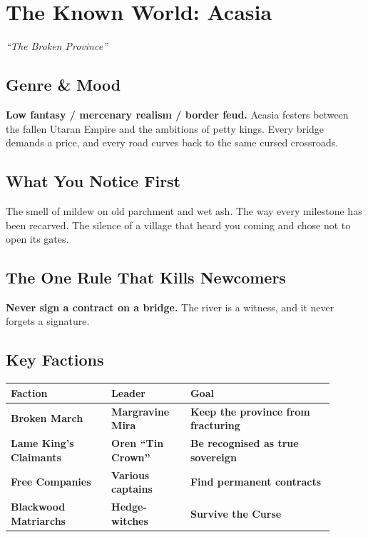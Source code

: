 \documentclass[10pt,twocolumn]{article} %
\begin{document}
\section{The Known World: Acasia}
\textit{``The Broken Province''}

\subsection{Genre \& Mood}
\textbf{Low fantasy / mercenary realism / border feud.} Acasia festers between the fallen Utaran Empire and the ambitions of petty kings. Every bridge demands a price, and every road curves back to the same cursed crossroads.

\subsection{What You Notice First}
The smell of mildew on old parchment and wet ash. The way every milestone has been recarved. The silence of a village that heard you coming and chose not to open its gates.

\subsection{The One Rule That Kills Newcomers}
\textbf{Never sign a contract on a bridge.} The river is a witness, and it never forgets a signature.

\subsection{Key Factions}
\begin{coretable}
\begin{tabular}{>{\bfseries}p{0.28\linewidth} >{\bfseries}p{0.22\linewidth} >{\bfseries}p{0.4\linewidth}}
\toprule
\textbf{Faction} & \textbf{Leader} & \textbf{Goal} \\
\midrule
Broken March & Margravine Mira & Keep the province from fracturing \\
Lame King's Claimants & Oren ``Tin Crown'' & Be recognised as true sovereign \\
Free Companies & Various captains & Find permanent contracts \\
Blackwood Matriarchs & Hedge-witches & Survive the Curse \\
\bottomrule
\end{tabular}
\end{coretable}
\end{document}
